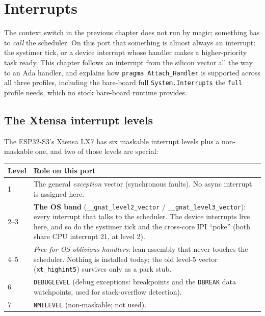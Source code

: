 \chapter{Interrupts}
\label{ch:interrupts}

The context switch in the previous chapter does not run by magic; something
has to \emph{call} the scheduler. On this port that something is almost always an
interrupt: the systimer tick, or a device interrupt whose handler makes a
higher-priority task ready. This chapter follows an interrupt from the silicon
vector all the way to an Ada handler, and explains how \texttt{pragma
Attach\_Handler} is supported across all three profiles, including the
bare-board full \texttt{System.Interrupts} the \texttt{full} profile needs,
which no stock bare-board runtime provides.

\section{The Xtensa interrupt levels}

The ESP32-S3's Xtensa LX7 has six maskable interrupt levels plus a non-maskable
one, and two of those levels are special:

\begin{longtable}{p{2.2cm} p{10.5cm}}
\toprule
\textbf{Level} & \textbf{Role on this port} \\ \midrule
\endhead
1     & The general \emph{exception} vector (synchronous faults). No async
        interrupt is assigned here. \\
2--3  & \textbf{The OS band} (\texttt{\_\_gnat\_level2\_vector} /
        \texttt{\_\_gnat\_level3\_vector}): every interrupt that talks to
        the scheduler. The device interrupts live here, and so do the systimer
        tick and the cross-core IPI ``poke'' (both share CPU interrupt 21, at
        level 2). \\
4--5  & \emph{Free for OS-oblivious handlers}: lean assembly that never
        touches the scheduler. Nothing is installed today; the old level-5
        vector (\texttt{xt\_highint5}) survives only as a park stub. \\
6     & \texttt{DEBUGLEVEL} (debug exceptions: breakpoints and the
        \texttt{DBREAK} data watchpoints, used for stack-overflow detection). \\
7     & \texttt{NMILEVEL} (non-maskable; not used). \\
\bottomrule
\end{longtable}

